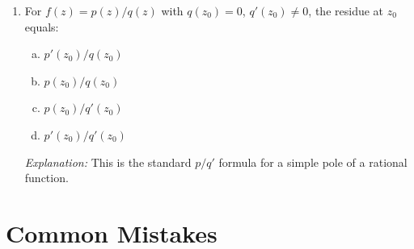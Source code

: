 \documentclass[12pt,a4paper]{article}
\begin{document}
\begin{enumerate}[leftmargin=*]
\textbf{Corrected answer: (b) $0$.}

\textit{Explanation:} $\sin z = z - z^3/6 + z^5/120 - \cdots$; dividing by $z^3$ gives
$z^{-2} - 1/6 + z^2/120 - \cdots$.  No $z^{-1}$ term; residue $= 0$.

\item For $f(z) = p(z)/q(z)$ with $q(z_0)=0$, $q'(z_0)\neq 0$, the residue at $z_0$ equals:
\begin{enumerate}[(a)]
  \item $p'(z_0)/q(z_0)$
  \item $p(z_0)/q(z_0)$
  \item \textbf{$p(z_0)/q'(z_0)$}
  \item $p'(z_0)/q'(z_0)$
\end{enumerate}
\textit{Explanation:} This is the standard $p/q'$ formula for a simple pole of a rational function.

\end{enumerate}

\section{Common Mistakes}
\end{document}
